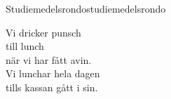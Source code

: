 \begin{song}{Studiemedelsrondo}{studiemedelsrondo}
\begin{vers}
\repopen Vi dricker punsch\\
till lunch\\
när vi har fått avin.\\
Vi lunchar hela dagen\\
tills kassan gått i sin. \repclose\\
\end{vers}
\end{song}
